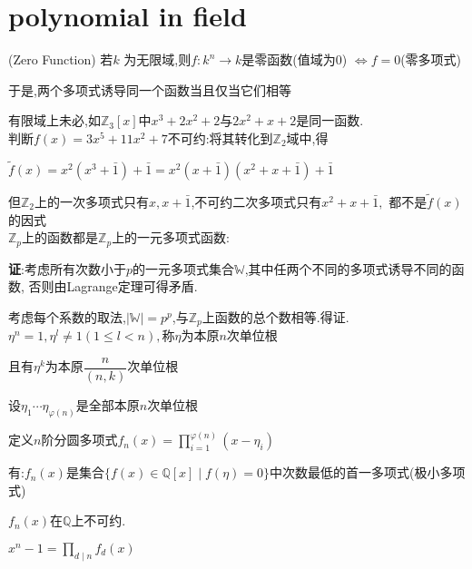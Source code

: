 \section{polynomial in field}
(Zero Function) 若$ k$ 为无限域,则$ f:k^n\rightarrow k$是零函数(值域为0)
$ \Leftrightarrow f=0$(零多项式)

于是,两个多项式诱导同一个函数当且仅当它们相等

有限域上未必,如$ \mathbb{Z}_3[x]$中$ x^3+2x^2+2$与$ 2x^2+x+2$是同一函数.
\\

判断$ f(x)=3x^5+11x^2+7$不可约:将其转化到$ \mathbb{Z}_2$域中,得

$ \tilde{f}(x)=x^2(x^3+\bar{1})+\bar{1}=x^2(x+\bar{1})(x^2+x+\bar{1})+\bar{1}$

但$ \mathbb{Z}_2$上的一次多项式只有$ x,x+\bar{1}$,不可约二次多项式只有$ x^2+x+\bar{1},$
都不是$ \tilde{f}(x)$的因式
\\

$ \mathbb{Z}_p$上的函数都是$ \mathbb{Z}_p$上的一元多项式函数:

{\bf 证}:考虑所有次数小于$ p$的一元多项式集合$ \mathbb{W}$,其中任两个不同的多项式诱导不同的函数,
否则由Lagrange定理可得矛盾.

考虑每个系数的取法,$ |\mathbb{W}|=p^p$,与$ \mathbb{Z}_p$上函数的总个数相等.得证.
\\

$ \eta^n =1,\eta^l\ne 1(1\le l<n),$称$ \eta$为本原$ n$次单位根

且有$ \eta^k$为本原$ \dfrac{n}{(n,k)}$次单位根

设$ \eta_1\cdots \eta_{\varphi(n)}$是全部本原$ n$次单位根

定义$ n$阶分圆多项式$ f_n(x)=\prod_{i=1}^{\varphi(n)}{( x-\eta_i )}$

有:$ f_n(x)$是集合$ \{ f(x)\in \mathbb{Q}[x]\mid f(\eta)=0\}$中次数最低的首一多项式(极小多项式)

$ f_n(x)$在$ \mathbb{Q}$上不可约.

$ x^n-1=\prod_{d \mid n}{f_d(x)}$

